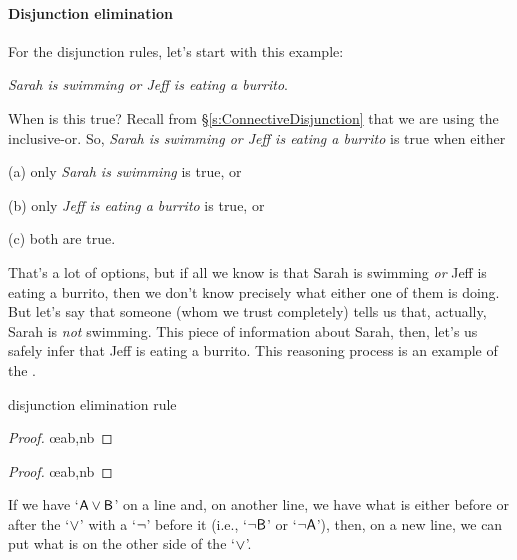 \paragraph{Disjunction elimination}
For the disjunction rules, let's start with this example: 
\begin{ebullet}
	\item[] \textit{Sarah is swimming or Jeff is eating a burrito}. 
\end{ebullet}
When is this true? Recall from \S \ref{s:ConnectiveDisjunction} that we are using the inclusive-or. So, \textit{Sarah is swimming or Jeff is eating a burrito} is true when either
\begin{ebullet}
	\item[(a)] only \textit{Sarah is swimming} is true, or 
	\item[(b)] only \textit{Jeff is eating a burrito} is true, or 
	\item[(c)] both are true. 
\end{ebullet}
That's a lot of options, but if all we know is that Sarah is swimming \textit{or} Jeff is eating a burrito, then we don't know precisely what either one of them is doing. But let's say that someone (whom we trust completely) tells us that, actually, Sarah is \textit{not} swimming. This piece of information about Sarah, then, let's us safely infer that Jeff is eating a burrito. This reasoning process is an example of the .

\medskip
\begin{factboxy}{disjunction elimination rule}
\begin{proof}
	 \oe{ab,nb}
\end{proof}

\begin{proof}
	 \oe{ab,nb}
\end{proof}

\small{If we have `$\mathsf{A}\vee\mathsf{B}$' on a line and, on another line, we have what is either before or after the `$\vee$' with a `${\neg}$' before it (i.e., `${\neg}\mathsf{B}$' or `${\neg}\mathsf{A}$'), then, on a new line, we can put what is on the other side of the `$\vee$'.}

\end{factboxy}					%


